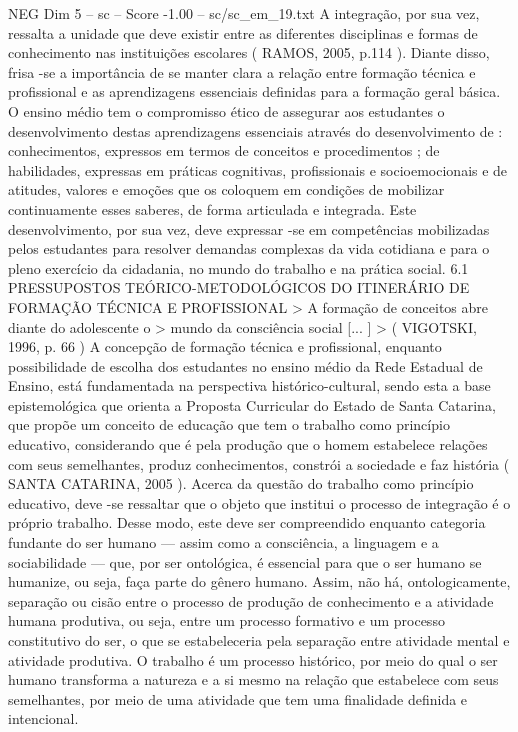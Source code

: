 \begin{textsample}{NEG Dim 5 – sc – Score -1.00 – sc/sc\_em\_19.txt}
A integração, por sua vez, ressalta a unidade que deve existir entre as diferentes disciplinas e formas de conhecimento nas instituições escolares ( RAMOS, 2005, p.114 ).
Diante disso, frisa -se a importância de se manter clara a relação entre formação técnica e profissional e as aprendizagens essenciais definidas para a formação geral básica.
O ensino médio tem o compromisso ético de assegurar aos estudantes o desenvolvimento destas aprendizagens essenciais através do desenvolvimento de : conhecimentos, expressos em termos de conceitos e procedimentos ; de habilidades, expressas em práticas cognitivas, profissionais e socioemocionais e de atitudes, valores e emoções que os coloquem em condições de mobilizar continuamente esses saberes, de forma articulada e integrada.
Este desenvolvimento, por sua vez, deve expressar -se em competências mobilizadas pelos estudantes para resolver demandas complexas da vida cotidiana e para o pleno exercício da cidadania, no mundo do trabalho e na prática social. 6.1 PRESSUPOSTOS TEÓRICO-METODOLÓGICOS DO ITINERÁRIO DE FORMAÇÃO TÉCNICA E PROFISSIONAL > A formação de conceitos abre diante do adolescente o > mundo da consciência social [... ] > ( VIGOTSKI, 1996, p. 66 ) A concepção de formação técnica e profissional, enquanto possibilidade de escolha dos estudantes no ensino médio da Rede Estadual de Ensino, está fundamentada na perspectiva histórico-cultural, sendo esta a base epistemológica que orienta a Proposta Curricular do Estado de Santa Catarina, que propõe um conceito de educação que tem o trabalho como princípio educativo, considerando que é pela produção que o homem estabelece relações com seus semelhantes, produz conhecimentos, constrói a sociedade e faz história ( SANTA CATARINA, 2005 ).
Acerca da questão do trabalho como princípio educativo, deve -se ressaltar que o objeto que institui o processo de integração é o próprio trabalho.
Desse modo, este deve ser compreendido enquanto categoria fundante do ser humano — assim como a consciência, a linguagem e a sociabilidade — que, por ser ontológica, é essencial para que o ser humano se humanize, ou seja, faça parte do gênero humano.
Assim, não há, ontologicamente, separação ou cisão entre o processo de produção de conhecimento e a atividade humana produtiva, ou seja, entre um processo formativo e um processo constitutivo do ser, o que se estabeleceria pela separação entre atividade mental e atividade produtiva.
O trabalho é um processo histórico, por meio do qual o ser humano transforma a natureza e a si mesmo na relação que estabelece com seus semelhantes, por meio de uma atividade que tem uma finalidade definida e intencional.

\end{textsample}
